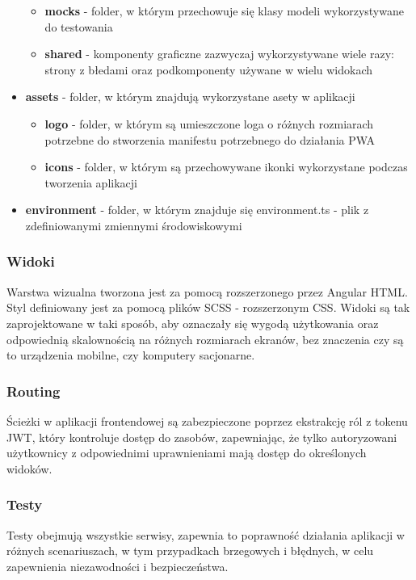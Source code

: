 \documentclass[../../main.tex]{subfiles}
\begin{document}
\begin{itemize}
\begin{itemize}
\begin{itemize}
            \end{itemize}
            \item \textbf{mocks} - folder, w którym przechowuje się klasy modeli wykorzystywane do testowania
            \item \textbf{shared} - komponenty graficzne zazwyczaj wykorzystywane wiele razy: strony z błedami oraz podkomponenty używane w wielu widokach  
        \end{itemize}
        \item \textbf{assets} - folder, w którym znajdują wykorzystane asety w aplikacji
        \begin{itemize}
            \item \textbf{logo} - folder, w którym są umieszczone loga o różnych rozmiarach potrzebne do stworzenia manifestu potrzebnego do działania PWA
            \item \textbf{icons} - folder, w którym są przechowywane ikonki wykorzystane podczas tworzenia aplikacji
        \end{itemize}
        \item \textbf{environment} - folder, w którym znajduje się environment.ts - plik z zdefiniowanymi zmiennymi środowiskowymi
    \end{itemize}

    \subsubsection{Widoki}
    Warstwa wizualna tworzona jest za pomocą rozszerzonego przez Angular HTML. Styl definiowany jest za pomocą plików SCSS - rozszerzonym CSS. Widoki są tak zaprojektowane w taki sposób, aby oznaczały się wygodą użytkowania oraz odpowiednią skalownością na różnych rozmiarach ekranów, bez znaczenia czy są to urządzenia mobilne, czy komputery sacjonarne. 

    \subsubsection{Routing}
    Ścieżki w aplikacji frontendowej są zabezpieczone poprzez ekstrakcję ról z tokenu JWT, który kontroluje dostęp do zasobów, zapewniając, że tylko autoryzowani użytkownicy z odpowiednimi uprawnieniami mają dostęp do określonych widoków.

    \subsubsection{Testy}
    Testy obejmują wszystkie serwisy, zapewnia to poprawność działania aplikacji w różnych scenariuszach, w tym przypadkach brzegowych i błędnych, w celu zapewnienia niezawodności i bezpieczeństwa. %
\end{document}
